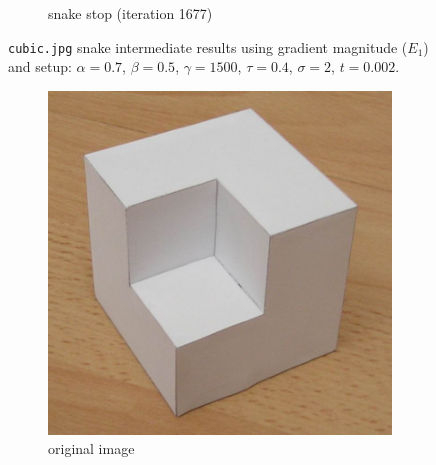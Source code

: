 \documentclass[11pt,a4paper]{article}
\begin{document}
\begin{figure}[H]
\begin{subfigure}[t]{0.21\textwidth}
        \caption{snake stop (iteration 1677)}
        \label{fig:cubic_end}
    \end{subfigure}
    \caption{\texttt{cubic.jpg} snake intermediate results using gradient
    magnitude ($E_1$) and setup: $\alpha
= 0.7$, $\beta = 0.5$, $\gamma = 1500$, $\tau = 0.4$, $\sigma = 2$, $t = 0.002$.}
    \label{fig:cubic_intermediate}
\end{figure}

\begin{figure}[H]
    \centering
    \begin{subfigure}[t]{0.21\textwidth}
        \includegraphics[width=\textwidth]{src/images/cubic_shape01.jpg}
        \caption{original image}
        \label{fig:cubic_log_original}
    \end{subfigure}
    \begin{subfigure}[t]{0.21\textwidth}

\end{subfigure}
\end{figure}
\end{document}
